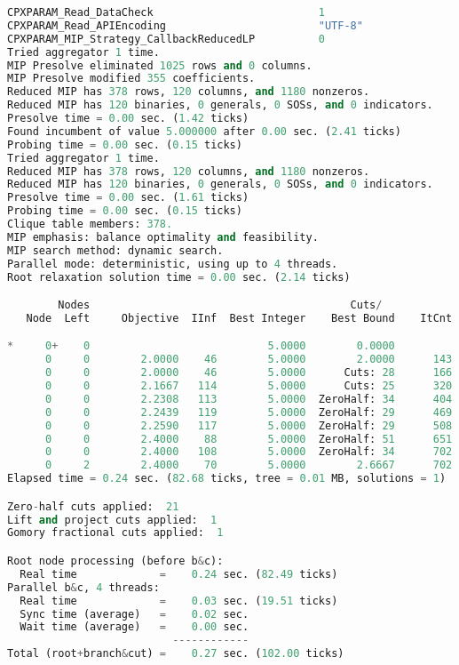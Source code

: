 \begin{lstlisting}[language=Python]CPXPARAM_Read_DataCheck                          1
CPXPARAM_Read_APIEncoding                        "UTF-8"
CPXPARAM_MIP_Strategy_CallbackReducedLP          0
Tried aggregator 1 time.
MIP Presolve eliminated 1025 rows and 0 columns.
MIP Presolve modified 355 coefficients.
Reduced MIP has 378 rows, 120 columns, and 1180 nonzeros.
Reduced MIP has 120 binaries, 0 generals, 0 SOSs, and 0 indicators.
Presolve time = 0.00 sec. (1.42 ticks)
Found incumbent of value 5.000000 after 0.00 sec. (2.41 ticks)
Probing time = 0.00 sec. (0.15 ticks)
Tried aggregator 1 time.
Reduced MIP has 378 rows, 120 columns, and 1180 nonzeros.
Reduced MIP has 120 binaries, 0 generals, 0 SOSs, and 0 indicators.
Presolve time = 0.00 sec. (1.61 ticks)
Probing time = 0.00 sec. (0.15 ticks)
Clique table members: 378.
MIP emphasis: balance optimality and feasibility.
MIP search method: dynamic search.
Parallel mode: deterministic, using up to 4 threads.
Root relaxation solution time = 0.00 sec. (2.14 ticks)

        Nodes                                         Cuts/
   Node  Left     Objective  IInf  Best Integer    Best Bound    ItCnt     Gap

*     0+    0                            5.0000        0.0000           100.00%
      0     0        2.0000    46        5.0000        2.0000      143   60.00%
      0     0        2.0000    46        5.0000      Cuts: 28      166   60.00%
      0     0        2.1667   114        5.0000      Cuts: 25      320   56.67%
      0     0        2.2308   113        5.0000  ZeroHalf: 34      404   55.38%
      0     0        2.2439   119        5.0000  ZeroHalf: 29      469   55.12%
      0     0        2.2590   117        5.0000  ZeroHalf: 29      508   54.82%
      0     0        2.4000    88        5.0000  ZeroHalf: 51      651   52.00%
      0     0        2.4000   108        5.0000  ZeroHalf: 34      702   52.00%
      0     2        2.4000    70        5.0000        2.6667      702   46.67%
Elapsed time = 0.24 sec. (82.68 ticks, tree = 0.01 MB, solutions = 1)

Zero-half cuts applied:  21
Lift and project cuts applied:  1
Gomory fractional cuts applied:  1

Root node processing (before b&c):
  Real time             =    0.24 sec. (82.49 ticks)
Parallel b&c, 4 threads:
  Real time             =    0.03 sec. (19.51 ticks)
  Sync time (average)   =    0.02 sec.
  Wait time (average)   =    0.00 sec.
                          ------------
Total (root+branch&cut) =    0.27 sec. (102.00 ticks)
\end{lstlisting}